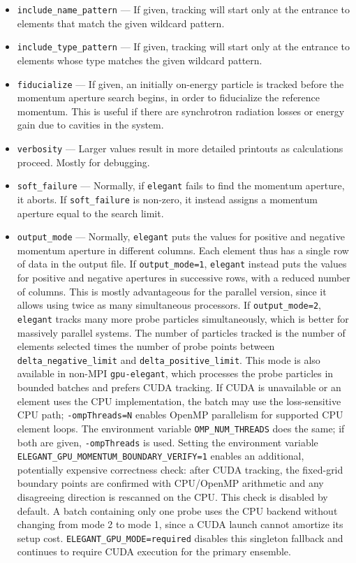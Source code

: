 \documentclass[11pt]{article}
\begin{document}
\begin{itemize}
\item \verb|include_name_pattern| --- If given, tracking will start
only at the entrance to elements that match the given wildcard
pattern.

\item \verb|include_type_pattern| --- If given, tracking will start
only at the entrance to elements whose type matches the given wildcard
pattern.

\item \verb|fiducialize| --- If given, an initially on-energy particle is tracked before
 the momentum aperture search begins, in order to fiducialize the reference momentum.
 This is useful if there are synchrotron radiation losses or energy gain due to cavities
 in the system.

\item \verb|verbosity| --- Larger values result in more detailed
printouts as calculations proceed.  Mostly for debugging.

\item \verb|soft_failure| --- Normally, if {\tt elegant} fails to find the momentum aperture,
it aborts.  If \verb|soft_failure| is non-zero, it instead assigns a momentum aperture equal
to the search limit.

\item \verb|output_mode| --- Normally, {\tt elegant} puts the values for positive and
negative momentum aperture in different columns.  Each element thus has a single row of
data in the output file.  If \verb|output_mode=1|, {\tt elegant} instead puts
the values for positive and negative apertures in successive rows, with a reduced number
of columns.  This is mostly advantageous for the parallel version, since it allows using
twice as many simultaneous processors.
If \verb|output_mode=2|, {\tt elegant} tracks many more probe particles simultaneously, which
is better for massively parallel systems. The number of particles tracked is the number of
elements selected times the number of probe points between  \verb|delta_negative_limit| and \verb|delta_positive_limit|.
This mode is also available in non-MPI \verb|gpu-elegant|, which processes the
probe particles in bounded batches and prefers CUDA tracking.  If CUDA is
unavailable or an element uses the CPU implementation, the batch may use the
loss-sensitive CPU path; \verb|-ompThreads=N| enables OpenMP parallelism for
supported CPU element loops.  The environment variable \verb|OMP_NUM_THREADS|
does the same; if both are given, \verb|-ompThreads| is used.  Setting the environment variable
\verb|ELEGANT_GPU_MOMENTUM_BOUNDARY_VERIFY=1| enables an additional,
potentially expensive correctness check: after CUDA tracking, the fixed-grid
boundary points are confirmed with CPU/OpenMP arithmetic and any disagreeing
direction is rescanned on the CPU.  This check is disabled by default.  A
batch containing only one probe uses the CPU
backend without changing from mode 2 to mode 1, since a CUDA launch cannot
amortize its setup cost.  \verb|ELEGANT_GPU_MODE=required| disables this
singleton fallback and continues to require CUDA execution for the primary
ensemble.


\end{itemize}
\end{document}
